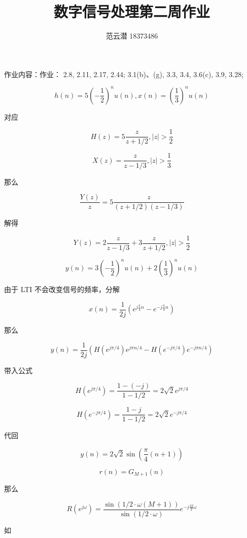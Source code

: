 \documentclass[lang=cn,11pt,a4paper,cite=authoryear]{elegantpaper}
\title{数字信号处理\quad 第二周作业}
\author{范云潜 18373486}
\institute{微电子学院 184111 班}
\date{\zhtoday}
\begin{document}
\maketitle

作业内容：作业：
2.8,
2.11,
2.17,
2.44;
3.1(b)、(g),
3.3,
3.4,
3.6(c),
3.9,
3.28;




\[h(n) = 5 (-\frac{1}{2})^n u(n), x(n) = (\frac{1}{3})^n u(n)\]

对应 

\[H(z) = 5 \frac{z}{z + 1/2}, |z| > \frac{1}{2}\]

\[X(z) = \frac{z}{z - 1/3}, |z| > \frac{1}{3}\]

那么 

\[\frac{Y(z)}{z} = 5 \frac{z}{(z+1/2)(z-1/3)}\]

解得

\[Y(z) = 2 \frac{z}{z - 1/3} + 3 \frac{z}{z + 1/2}, |z| > \frac{1}{2}\]

\[y(n) = 3 (- \frac{1}{2})^n u(n) + 2 (\frac{1}{3})^n u(n)\]


由于 LTI 不会改变信号的频率，分解

\[x(n) = \frac{1}{2 j} \left(e^{j \frac{\pi}{4} n} - e^{-j \frac{\pi}{4} n}\right)\]

那么 

\[y(n) = \frac{1}{2 j} \left(H(e^{j \pi/4})e^{j \pi n / 4  } - H(e^{-j \pi/4}) e^{-j \pi n / 4} \right)\]


带入公式

\[H(e^{j \pi / 4}) = \frac{1 - (- j)}{1 - 1/2} = 2\sqrt{2}e^{j \pi/4}\]     

\[H(e^{-j \pi / 4}) = \frac{1 - j}{1 - 1/2} = 2\sqrt{2}e^{-j \pi/4}\]     

代回

\[y(n) = 2 \sqrt{2} \sin (\frac{\pi}{4} (n+1))\]



\[r(n) = G_{M+1}(n)\]

那么 

\[R(e^{j \omega}) = \frac{\sin(1/2 \cdot \omega(M+1))}{\sin(1/2 \cdot \omega)} e^{-j \frac{M}{2} \omega}\]



如

\end{document}
